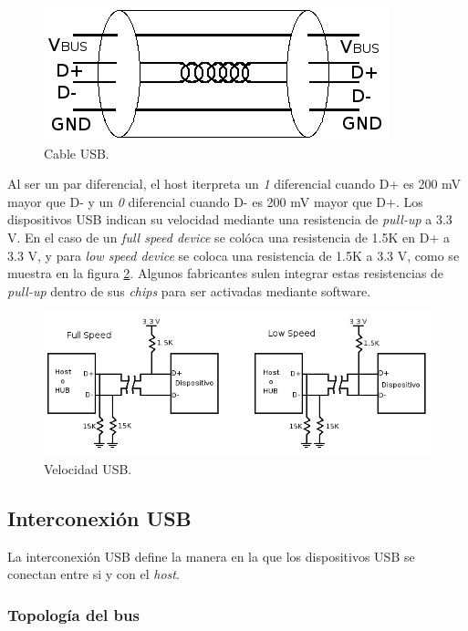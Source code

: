 \begin{figure}
\centering
\includegraphics[scale=0.5]{./img/electric_usb.png}
\caption{Cable USB.}
\label{fig:electric_usb}
\end{figure}

Al ser un par diferencial, el host iterpreta un \emph{1} diferencial cuando D+
es 200 mV mayor que D- y un \emph{0} diferencial cuando D- es 200 mV mayor que
D+. 
Los dispositivos USB indican su velocidad mediante una resistencia de
\emph{pull-up} a 3.3 V. En el caso de un \emph{full speed device} se col\'oca
una resistencia de 1.5K en D+ a 3.3 V, y para \emph{low speed device} se coloca
una resistencia de 1.5K a 3.3 V, como se muestra en la figura
\ref{fig:electric_speed_usb}.
Algunos fabricantes sulen integrar estas resistencias de \emph{pull-up} dentro
de sus \emph{chips} para ser activadas mediante software.

\begin{figure}
\centering
\includegraphics[scale=0.5]{./img/electric_speed_usb.png}
\caption{Velocidad USB.}
\label{fig:electric_speed_usb}
\end{figure}


\subsection{Interconexi\'on USB}

La interconexi\'on USB define la manera en la que los dispositivos USB se
conectan entre si y con el \emph{host}. 

\subsubsection{Topolog\'ia del bus}

